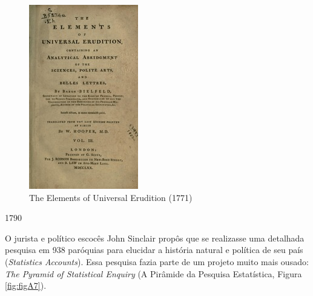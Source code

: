 \documentclass[
]{book}
\begin{document}
\hfill\break

\begin{figure}

{\centering \includegraphics[width=0.75\linewidth]{images1/hooper} 

}

\caption{The Elements of Universal Erudition  (1771)}\label{fig:figA6}
\end{figure}

\hfill\break

1790

\hfill\break

O jurista e político escocês John Sinclair propôs que se realizasse uma detalhada pesquisa em 938 paróquias para elucidar a história natural e política de seu país (\emph{Statistics Accounts}). Essa pesquisa fazia parte de um projeto muito mais ousado: \emph{The Pyramid of Statistical Enquiry} (A Pirâmide da Pesquisa Estatística, Figura \ref{fig:figA7}).

\hfill\break
\end{document}
